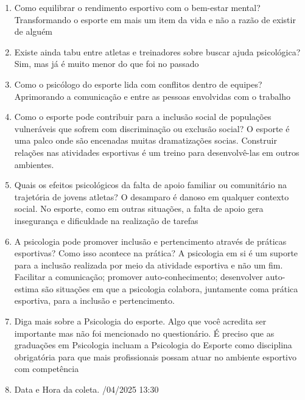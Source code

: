 \begin{enumerate}
    \item Como equilibrar o rendimento esportivo com o bem-estar mental?
        \subitem Transformando o esporte em mais um item da vida e não a razão de existir de alguém
    \item Existe ainda tabu entre atletas e treinadores sobre buscar ajuda psicológica?
        \subitem Sim, mas já é muito menor do que foi no passado
    \item Como o psicólogo do esporte lida com conflitos dentro de equipes?
        \subitem Aprimorando a comunicação e entre as pessoas envolvidas com o trabalho
    \item Como o esporte pode contribuir para a inclusão social de populações vulneráveis que sofrem com discriminação ou exclusão social?
        \subitem O esporte é uma palco onde são encenadas muitas dramatizações socias. Construir relações nas atividades esportivas é um treino para desenvolvê-las em outros ambientes.
    \item Quais os efeitos psicológicos da falta de apoio familiar ou comunitário na trajetória de jovens atletas?
        \subitem O desamparo é danoso em qualquer contexto social. No esporte, como em outras situações, a falta de apoio gera insegurança e dificuldade na realização de tarefas
    \item A psicologia pode promover inclusão e pertencimento através de práticas esportivas? Como isso acontece na prática?
        \subitem A psicologia em si é um suporte para a inclusão realizada por meio da atividade esportiva e não um fim. Facilitar a comunicação; promover auto-conhecimento; desenvolver auto-estima são situações em que a psicologia colabora, juntamente coma prática esportiva, para a inclusão e pertencimento.
    \item Diga mais sobre a Psicologia do esporte.  Algo que você acredita ser importante mas não foi mencionado no questionário.
        \subitem É preciso que as graduações em Psicologia incluam a Psicologia do Esporte como disciplina obrigatória para que mais profissionais possam atuar no ambiente esportivo com competência
    \item Data e Hora da coleta.
        /04/2025 13:30
\end{enumerate}